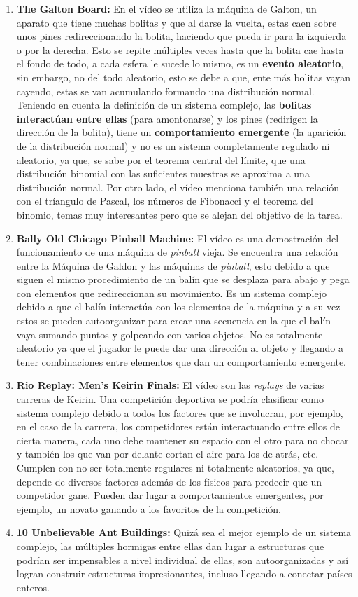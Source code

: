 \documentclass[12pt]{article}
\begin{document}
\begin{enumerate}
\item \textbf{The Galton Board:} En el vídeo se utiliza la máquina de Galton, un aparato que tiene muchas bolitas y que al darse la vuelta, estas caen sobre unos pines redireccionando la bolita, haciendo que pueda ir para la izquierda o por la derecha. Esto se repite múltiples veces hasta que la bolita cae hasta el fondo de todo, a cada esfera le sucede lo mismo, es un \textbf{evento aleatorio}, sin embargo, no del todo aleatorio, esto se debe a que, ente más bolitas vayan cayendo, estas se van acumulando formando una distribución normal. Teniendo en cuenta la definición de un sistema complejo, las \textbf{bolitas interactúan entre ellas} (para amontonarse) y los pines (redirigen la dirección de la bolita), tiene un \textbf{comportamiento emergente} (la aparición de la distribución normal) y no es un sistema completamente regulado ni aleatorio, ya que, se sabe por el teorema central del límite, que una distribución binomial con las suficientes muestras se aproxima a una distribución normal. Por otro lado, el vídeo menciona también una relación con el tríangulo de Pascal, los números de Fibonacci y el teorema del binomio, temas muy interesantes pero que se alejan del objetivo de la tarea.
\item \textbf{Bally Old Chicago Pinball Machine:} El vídeo es una demostración del funcionamiento de una máquina de \textit{pinball} vieja. Se encuentra una relación entre la Máquina de Galdon y las máquinas de \textit{pinball}, esto debido a que siguen el mismo procedimiento de un balín que se desplaza para abajo y pega con elementos que redireccionan su movimiento. Es un sistema complejo debido a que el balín interactúa con los elementos de la máquina y a su vez estos se pueden autoorganizar para crear una secuencia en la que el balín vaya sumando puntos y golpeando con varios objetos. No es totalmente aleatorio ya que el jugador le puede dar una dirección al objeto y llegando a tener combinaciones entre elementos que dan un comportamiento emergente.
\item \textbf{Rio Replay: Men's Keirin Finals:} El vídeo son las \textit{replays} de varias carreras de Keirin. Una competición deportiva se podría clasificar como sistema complejo debido a todos los factores que se involucran, por ejemplo, en el caso de la carrera, los competidores están interactuando entre ellos de cierta manera, cada uno debe mantener su espacio con el otro para no chocar y también los que van por delante cortan el aire para los de atrás, etc. Cumplen con no ser totalmente regulares ni totalmente aleatorios, ya que, depende de diversos factores además de los físicos para predecir que un competidor gane. Pueden dar lugar a comportamientos emergentes, por ejemplo, un novato ganando a los favoritos de la competición.
\item \textbf{10 Unbelievable Ant Buildings:} Quizá sea el mejor ejemplo de un sistema complejo, las múltiples hormigas entre ellas dan lugar a estructuras que podrían ser impensables a nivel individual de ellas, son autoorganizadas y así logran construir estructuras impresionantes, incluso llegando a conectar países enteros.
\end{enumerate}
\end{document}
